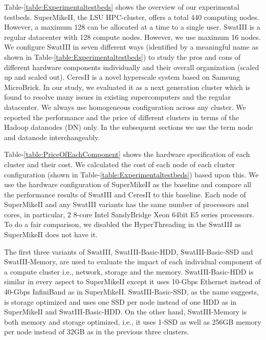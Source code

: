 \documentclass[10pt, conference, compsocconf]{IEEEtran}
\begin{document}
Table-\ref{table:Experimentaltestbeds} shows the overview of our experimental testbeds. SuperMikeII, the LSU HPC-cluster, offers a total 440 computing nodes. However, a maximum 128 can be allocated at a time to a single user. SwatIII is a regular datacenter with 128 compute nodes. However, we use maximum 16 nodes. We configure SwatIII in seven different ways (identified by a meaningful name as shown in Table-\ref{table:Experimentaltestbeds}) to study the pros and cons of different hardware components individually and their overall organization (scaled up and scaled out). CeresII is a novel hyperscale system based on Samsung MicroBrick. In our study, we evaluated it as a next generation cluster which is found to resolve many issues in existing supercomputers and the regular datacenter. We always use homogeneous configuration across any cluster. We reported the performance and the price of different clusters in terms of the Hadoop datanodes (DN) only. In the subsequent sections we use the term node and datanode interchangeably.

Table-\ref{table:PriceOfEachComponent} shows the hardware specification of each cluster and their cost. We calculated the cost of each node of each cluster configuration (shown in Table-\ref{table:Experimentaltestbeds}) based upon  this. We use the hardware configuration of SuperMikeII as the baseline and compare all the performance results of SwatIII and CeresII to this baseline. Each node of SuperMikeII and any SwatIII variants has the same number of processors and cores, in particular, 2 8-core Intel SandyBridge Xeon 64bit E5 series processors. To do a fair comparison, we disabled the HyperThreading in the SwatIII as SuperMikeII does not have it. 
 
The first three variants of SwatIII, SwatIII-Basic-HDD, SwatIII-Basic-SSD and SwatIII-Memory, are used to evaluate the impact of each individual component of a compute cluster i.e., network, storage and the memory. SwatIII-Basic-HDD is similar in every aspect to SuperMikeII except it uses 10-Gbps Ethernet instead of 40-Gbps InfiniBand as in SuperMikeII. SwatIII-Basic-SSD, as the name suggests, is storage optimized and uses one SSD per node instead of one HDD as in SuperMikeII and SwatIII-Basic-HDD. On the other hand, SwatIII-Memory is both memory and storage optimized, i.e., it uses 1-SSD as well as 256GB memory per node instead of 32GB as in the previous three clusters. 
\end{document}
